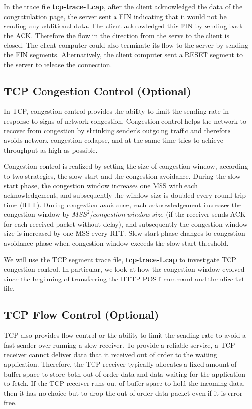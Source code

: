 In the trace file {\bf tcp-trace-1.cap}, after the client
acknowledged the data of the congratulation page, the server sent a
FIN indicating that it would not be sending any additional data. The
client acknowledged this FIN by sending back the ACK. Therefore the
flow in the direction from the serve to the client is closed. The
client computer could also terminate its flow to the server by
sending the FIN segments. Alternatively, the client computer 
sent a RESET segment to the server to release the connection.



\subsection{TCP Congestion Control (Optional)} 

\hspace*{0.5cm} In TCP, congestion control provides the ability to
limit the sending rate in response to signs of network congestion.
Congestion control helps the network to recover from congestion by
shrinking sender's outgoing traffic and therefore avoids network
congestion collapse, and at the same time tries to achieve
throughput as high as possible.

Congestion control is realized by setting the size of congestion
window, according to two strategies, the slow start and the congestion
avoidance. During the slow start phase, the congestion window increases 
one MSS with each acknowledgement, and subsequently 
the window size is doubled every round-trip time (RTT). During congestion
avoidance, each acknowledgement increases the congestion window by
$MSS^2/ congestion\ window\ size$ (if the receiver sends ACK for each
received packet without delay), and subsequently the congestion window
size is increased by one MSS every RTT. Slow start phase changes to
congestion avoidance phase when congestion window exceeds the
slow-start threshold.

We will use the TCP segment trace file,
\textbf{tcp-trace-1.cap} to
investigate TCP congestion control. In particular, we 
look at how the congestion window evolved since the beginning of
transferring the HTTP POST command and the alice.txt file.

\subsection{TCP Flow Control (Optional)}

\hspace*{0.5cm} TCP also provides flow control or the ability to limit
the sending rate to avoid a fast
sender over-running a slow receiver. To provide a reliable service,
a TCP receiver cannot deliver data that it received out of order to
the waiting application. Therefore, the TCP receiver typically
allocates a fixed amount of buffer space to store both out-of-order
data and data waiting for the application to fetch. If the TCP
receiver runs out of buffer space to hold the incoming data, then it
has no choice but to drop the out-of-order data packet even
if it is error-free.

